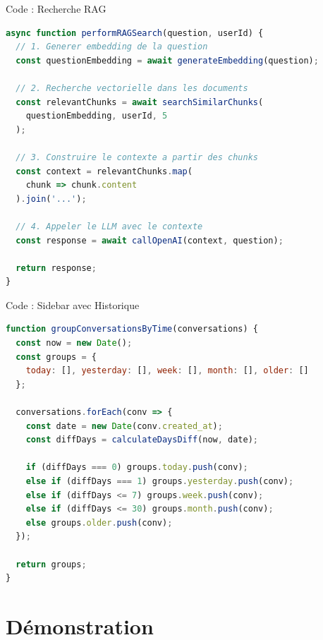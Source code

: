 \documentclass[aspectratio=169]{beamer}
\begin{document}
\begin{frame}[fragile]{Code : Recherche RAG}
\begin{lstlisting}[language=JavaScript, basicstyle=\ttfamily\tiny]
async function performRAGSearch(question, userId) {
  // 1. Generer embedding de la question
  const questionEmbedding = await generateEmbedding(question);
  
  // 2. Recherche vectorielle dans les documents
  const relevantChunks = await searchSimilarChunks(
    questionEmbedding, userId, 5
  );
  
  // 3. Construire le contexte a partir des chunks
  const context = relevantChunks.map(
    chunk => chunk.content
  ).join('...');
  
  // 4. Appeler le LLM avec le contexte
  const response = await callOpenAI(context, question);
  
  return response;
}
\end{lstlisting}
\end{frame}

\begin{frame}[fragile]{Code : Sidebar avec Historique}
\begin{lstlisting}[language=JavaScript, basicstyle=\ttfamily\tiny]
function groupConversationsByTime(conversations) {
  const now = new Date();
  const groups = {
    today: [], yesterday: [], week: [], month: [], older: []
  };
  
  conversations.forEach(conv => {
    const date = new Date(conv.created_at);
    const diffDays = calculateDaysDiff(now, date);
    
    if (diffDays === 0) groups.today.push(conv);
    else if (diffDays === 1) groups.yesterday.push(conv);
    else if (diffDays <= 7) groups.week.push(conv);
    else if (diffDays <= 30) groups.month.push(conv);
    else groups.older.push(conv);
  });
  
  return groups;
}
\end{lstlisting}
\end{frame}

\section{Démonstration}
\end{document}
